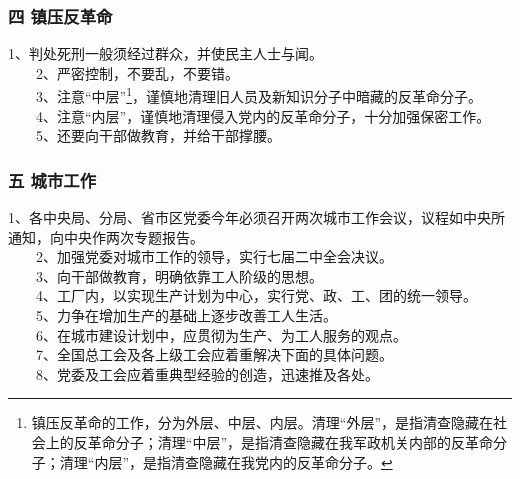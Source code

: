 \documentclass[cn,11pt,chinese]{elegantbook}
\def\myformat#1{\hfil\hfil #1}
\begin{document}
\subsubsection*{\myformat{四 镇压反革命}}
1、判处死刑一般须经过群众，并使民主人士与闻。\\
　　2、严密控制，不要乱，不要错。\\
　　3、注意“中层”\footnote[1]{镇压反革命的工作，分为外层、中层、内层。清理“外层”，是指清查隐藏在社会上的反革命分子；清理“中层”，是指清查隐藏在我军政机关内部的反革命分子；清理“内层”，是指清查隐藏在我党内的反革命分子。}，谨慎地清理旧人员及新知识分子中暗藏的反革命分子。\\
　　4、注意“内层”，谨慎地清理侵入党内的反革命分子，十分加强保密工作。\\
　　5、还要向干部做教育，并给干部撑腰。\\
\subsubsection*{\myformat{五 城市工作}}
1、各中央局、分局、省市区党委今年必须召开两次城市工作会议，议程如中央所通知，向中央作两次专题报告。\\
　　2、加强党委对城市工作的领导，实行七届二中全会决议。\\
　　3、向干部做教育，明确依靠工人阶级的思想。\\
　　4、工厂内，以实现生产计划为中心，实行党、政、工、团的统一领导。\\
　　5、力争在增加生产的基础上逐步改善工人生活。\\
　　6、在城市建设计划中，应贯彻为生产、为工人服务的观点。\\
　　7、全国总工会及各上级工会应着重解决下面的具体问题。\\
　　8、党委及工会应着重典型经验的创造，迅速推及各处。\\
\end{document}
